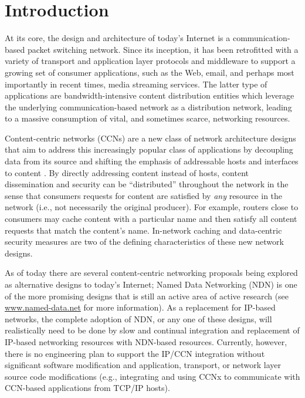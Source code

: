 \section{Introduction}
At its core, the design and architecture of today's Internet is a communication-based packet switching network. Since its inception, it has been retrofitted with a variety of transport and application layer protocols and middleware to support a growing set of consumer applications, such as the Web, email, and perhaps most importantly in recent times, media streaming services. The latter type of applications are bandwidth-intensive content distribution entities which leverage the underlying communication-based network as a distribution network, leading to a massive consumption of vital, and sometimes scarce, networking resources. 

Content-centric networks (CCNs) are a new class of network architecture designs that aim to address this increasingly popular class of applications by decoupling data from its source and shifting the emphasis of addressable hosts and interfaces to content \cite{first}. By directly addressing content instead of hosts, content dissemination and security can be ``distributed'' throughout the network in the sense that consumers requests for content are satisfied by \emph{any} resource in the network (i.e., not necessarily the original producer). For example, routers close to consumers may cache content with a particular name and then satisfy all content requests that match the content's name. In-network caching and data-centric security measures are two of the defining characteristics of these new network designs. 

As of today there are several content-centric networking proposals being explored as alternative designs to today's Internet; Named Data Networking (NDN) \cite{ndn-techreport} is one of the more promising designs that is still an active area of active research (see \url{www.named-data.net} for more information). As a replacement for IP-based networks, the complete adoption of NDN, or any one of these designs, will realistically need to be done by slow and continual integration and replacement of IP-based networking resources with NDN-based resources. Currently, however, there is no engineering plan to support the IP/CCN integration without significant software modification and application, transport, or network layer source code modifications (e.g., integrating and using CCNx to communicate with CCN-based applications from TCP/IP hosts).

